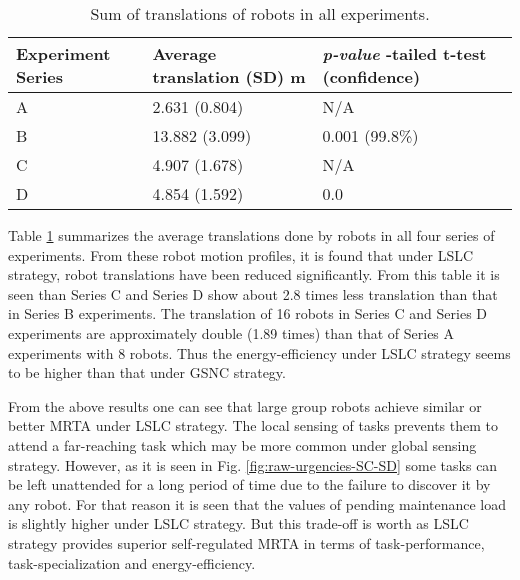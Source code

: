 \documentclass[journal]{IEEEtran}
\begin{document}
\begin{table}[H]
\begin{center}
\caption{Sum of translations of robots in all experiments.}
\begin{tabular}{|p{0.8in}|p{1in}|p{0.9in}|}
\hline Experiment \protect\newline Series & Average \protect\newline translation \protect\newline(SD) m & \textit{p-value} \protect\newline 1-tailed t-test (confidence)\\ 
\hline A & 2.631 (0.804) & N/A\\ 
\hline B & 13.882 (3.099) & 0.001 (99.8\%)\\
\hline C & 4.907 (1.678) & N/A\\
\hline D  & 4.854  (1.592) & 0.0\\
\hline
\end{tabular}
\label{table:motion-cmp} 
\end{center}
\end{table}
Table \ref{table:motion-cmp} summarizes the average translations done by robots in all four series of experiments. From these robot motion profiles, it is found that under LSLC strategy, robot translations have been reduced significantly. From this table it is seen than Series C and Series D show about 2.8 times less translation than that in Series B experiments. The translation of 16 robots in Series C and Series D experiments are approximately double (1.89 times) than that of Series A experiments with 8 robots.  Thus the energy-efficiency under LSLC strategy seems to be higher  than that under GSNC strategy.

From the above results one can see that large group robots achieve similar or better MRTA under LSLC strategy. The local sensing of tasks prevents them to attend a far-reaching task which may be more common under global sensing strategy. However, as it is seen in Fig. \ref{fig:raw-urgencies-SC-SD}
some tasks can be left unattended for a long period of time due to the failure to discover it by any robot. For that reason it is seen that the values of pending maintenance load is slightly higher under LSLC strategy. But this trade-off is worth as LSLC strategy provides superior self-regulated MRTA in terms of task-performance, task-specialization and energy-efficiency.
\end{document}
